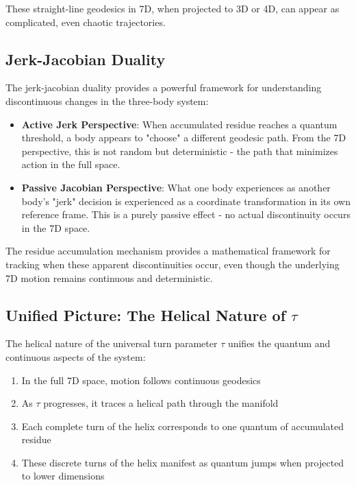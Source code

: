 \documentclass{article}
\begin{document}
These straight-line geodesics in 7D, when projected to 3D or 4D, can appear as complicated, even chaotic trajectories.

\subsection{Jerk-Jacobian Duality}

The jerk-jacobian duality provides a powerful framework for understanding discontinuous changes in the three-body system:

\begin{itemize}
\item \textbf{Active Jerk Perspective}: When accumulated residue reaches a quantum threshold, a body appears to "choose" a different geodesic path. From the 7D perspective, this is not random but deterministic - the path that minimizes action in the full space.

\item \textbf{Passive Jacobian Perspective}: What one body experiences as another body's "jerk" decision is experienced as a coordinate transformation in its own reference frame. This is a purely passive effect - no actual discontinuity occurs in the 7D space.
\end{itemize}

The residue accumulation mechanism provides a mathematical framework for tracking when these apparent discontinuities occur, even though the underlying 7D motion remains continuous and deterministic.

\subsection{Unified Picture: The Helical Nature of $\tau$}

The helical nature of the universal turn parameter $\tau$ unifies the quantum and continuous aspects of the system:

\begin{enumerate}
\item In the full 7D space, motion follows continuous geodesics
\item As $\tau$ progresses, it traces a helical path through the manifold
\item Each complete turn of the helix corresponds to one quantum of accumulated residue
\item These discrete turns of the helix manifest as quantum jumps when projected to lower dimensions
\end{enumerate}
\end{document}
